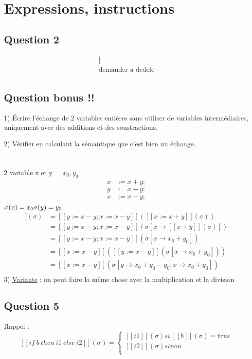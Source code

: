 \documentclass[11pt,a4paper]{article}
\begin{document}
	\section{Expressions, instructions}
	\subsection{Question 2}
	\begin{align*}
		[[tmp := x; x := y; ]]\\
		\text{demander a dedele}\\
	\end{align*}
	\subsection{Question bonus !!}
	1) Écrire l'échange de 2 variables entières sans utiliser de variables intermédiaires, uniquement avec des additions et des soustractions.
	
	2) Vérifier en calculant la sémantique que c'est bien un échange.
	\\\\\\
	2 variable x et y\ \ \   $x_{0}, y_{0}$
	\begin{align*}
		x &:= x + y;\\
		y &:= x - y;\\
		x &:= x - y;\\
	\end{align*}
	$\sigma(x) = x_{0} \\ \sigma(y) = y_{0}$
	\begin{align*}
		[[x := x + y; y := x - y; x := x - y]](\sigma) &= [[y := x - y; x := x - y]]([[x := x + y]](\sigma))\\
		&= [[y := x - y; x := x - y]](\sigma[x \to [[x + y]](\sigma)])\\
		&= [[y := x - y; x := x - y]](\sigma[x \to x_{0} + y_{0}])\\
		&= [[x := x - y]]([[y := x - y]](\sigma[x \to x_{0} + y_{0}]))\\
		&= [[x := x - y]](\sigma[y \to x_{0} + y_{0} - y_{0}; x \to x_{0} + y_{0}])\\
	\end{align*}
	3) \underline{Variante} : on peut faire la même chose avec la multiplication et la division
	\newpage
	
	\subsection{Question 5}
	Rappel :\\
	\[
		[[if\ b\ then\ i1\ else\ i2]](\sigma) =
		\begin{cases}
			[[i1]](\sigma) si\ [[b]](\sigma) = true\\
			[[i2]](\sigma) sinon\\
		\end{cases}
	\]
	
\end{document}
